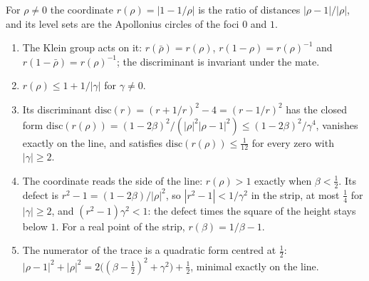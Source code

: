 \begin{proposition}\label{prop:apollonius-coordinate}
For $\rho\ne0$ the coordinate $r(\rho)=|1-1/\rho|$ is the ratio of distances
$|\rho-1|/|\rho|$, and its level sets are the Apollonius circles of the foci $0$ and $1$.
\begin{enumerate}[label=\textup{(\roman*)}]
  \item The Klein group acts on it: $r(\bar\rho)=r(\rho)$, $r(1-\rho)=r(\rho)^{-1}$ and
    $r(1-\bar\rho)=r(\rho)^{-1}$; the discriminant is invariant under the mate.
  \item $r(\rho)\le1+1/|\gamma|$ for $\gamma\ne0$.
  \item Its discriminant $\mathrm{disc}(r)=(r+1/r)^2-4=(r-1/r)^2$ has the closed form
    $\mathrm{disc}(r(\rho))=(1-2\beta)^2/(|\rho|^2|\rho-1|^2)\le(1-2\beta)^2/\gamma^4$,
    vanishes exactly on the line, and satisfies $\mathrm{disc}(r(\rho))\le\tfrac1{12}$ for
    every zero with $|\gamma|\ge2$.
  \item The coordinate reads the side of the line: $r(\rho)>1$ exactly when $\beta<\tfrac12$.
    Its defect is $r^2-1=(1-2\beta)/|\rho|^2$, so $|r^2-1|<1/\gamma^2$ in the strip, at most
    $\tfrac14$ for $|\gamma|\ge2$, and $(r^2-1)\gamma^2<1$: the defect times the square of
    the height stays below $1$.  For a real point of the strip, $r(\beta)=1/\beta-1$.
  \item The numerator of the trace is a quadratic form centred at $\tfrac12$:
    $|\rho-1|^2+|\rho|^2=2\bigl((\beta-\tfrac12)^2+\gamma^2\bigr)+\tfrac12$, minimal exactly
    on the line.
\end{enumerate}
%
\end{proposition}

